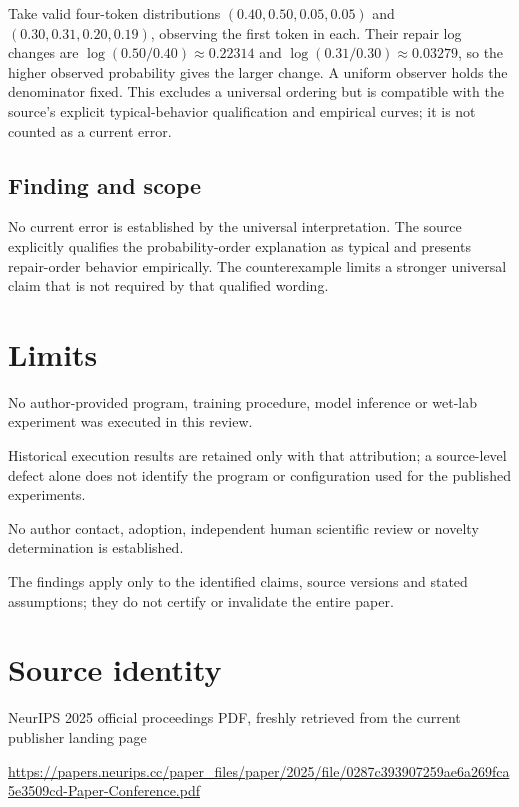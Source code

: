 \documentclass[11pt]{article}
\begin{document}
Take valid four-token distributions \((0.40,0.50,0.05,0.05)\) and \((0.30,0.31,0.20,0.19)\), observing the first token in each. Their repair log changes are \(\log(0.50/0.40)\approx0.22314\) and \(\log(0.31/0.30)\approx0.03279\), so the higher observed probability gives the larger change. A uniform observer holds the denominator fixed. This excludes a universal ordering but is compatible with the source’s explicit typical-behavior qualification and empirical curves; it is not counted as a current error.

\subsection*{Finding and scope}

No current error is established by the universal interpretation. The source explicitly qualifies the probability-order explanation as typical and presents repair-order behavior empirically. The counterexample limits a stronger universal claim that is not required by that qualified wording.

\section*{Limits}

No author-provided program, training procedure, model inference or wet-lab experiment was executed in this review.\par

Historical execution results are retained only with that attribution; a source-level defect alone does not identify the program or configuration used for the published experiments.\par

No author contact, adoption, independent human scientific review or novelty determination is established.\par

The findings apply only to the identified claims, source versions and stated assumptions; they do not certify or invalidate the entire paper.\par

\section*{Source identity}

NeurIPS 2025 official proceedings PDF, freshly retrieved from the current publisher landing page

\url{https://papers.neurips.cc/paper_files/paper/2025/file/0287c393907259ae6a269fca5e3509cd-Paper-Conference.pdf}
\end{document}
